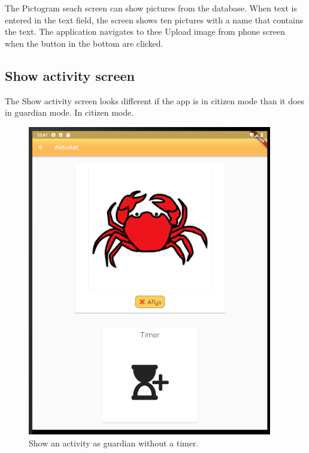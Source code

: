 The Pictogram seach screen can show pictures from the database. When text is entered in the text field, the screen shows ten pictures with a name that contains the text. The application navigates to thee Upload image from phone screen when the button in the bottom are clicked.

\subsection{Show activity screen}
The Show activity screen looks different if the app is in citizen mode than it does in guardian mode.
In citizen mode. 

\begin{figure}[H]
    \begin{center}
        \includegraphics[width=0.95\textwidth]{figures/FinalScreen/showActivityGuardian.png}
    \end{center}
    \caption{Show an activity as guardian without a timer.}
    \label{fig:finalShowActivityGuardianWithoutTimer}
\end{figure}
